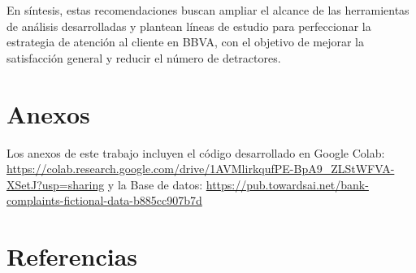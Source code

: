 \documentclass{matematicasud}
\begin{document}
En síntesis, estas recomendaciones buscan ampliar el alcance de las herramientas de análisis desarrolladas y plantean líneas de estudio para perfeccionar la estrategia de atención al cliente en BBVA, con el objetivo de mejorar la satisfacción general y reducir el número de detractores.

\section{Anexos}
Los anexos de este trabajo incluyen el código desarrollado en Google Colab: \url{https://colab.research.google.com/drive/1AVMlirkqufPE-BpA9_ZLStWFVA-XSetJ?usp=sharing} y la Base de datos: \url{https://pub.towardsai.net/bank-complaints-fictional-data-b885cc907b7d}

\section{Referencias}
\end{document}
